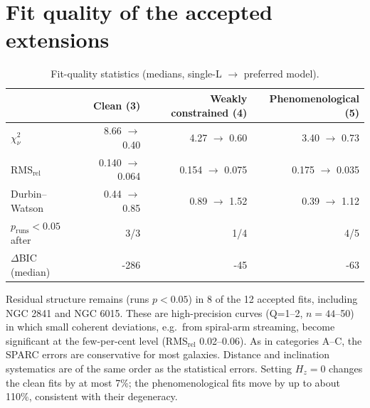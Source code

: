 \documentclass[10pt]{article}
\begin{document}
\section{Fit quality of the accepted extensions}
\begin{table}[h]\centering\small\caption{Fit-quality statistics (medians, single-L $\to$ preferred model).}\begin{tabular}{lrrr}\toprule & Clean (3) & Weakly constrained (4) & Phenomenological (5)\\\midrule
$\chi^2_\nu$ & 8.66 $\to$ 0.40 & 4.27 $\to$ 0.60 & 3.40 $\to$ 0.73\\
RMS$_\mathrm{rel}$ & 0.140 $\to$ 0.064 & 0.154 $\to$ 0.075 & 0.175 $\to$ 0.035\\
Durbin--Watson & 0.44 $\to$ 0.85 & 0.89 $\to$ 1.52 & 0.39 $\to$ 1.12\\
$p_\mathrm{runs}<0.05$ after & 3/3 & 1/4 & 4/5\\
$\Delta$BIC (median) & -286 & -45 & -63\\
\bottomrule\end{tabular}\end{table}
Residual structure remains (runs $p<0.05$) in 8 of the 12 accepted fits, including NGC 2841 and NGC 6015. These are high-precision curves (Q=1--2, $n=44$--50) in which small coherent deviations, e.g.\ from spiral-arm streaming, become significant at the few-per-cent level (RMS$_\mathrm{rel}$ 0.02--0.06). As in categories A--C, the SPARC errors are conservative for most galaxies. Distance and inclination systematics are of the same order as the statistical errors. Setting $H_z=0$ changes the clean fits by at most 7\%; the phenomenological fits move by up to about 110\%, consistent with their degeneracy.
\end{document}

